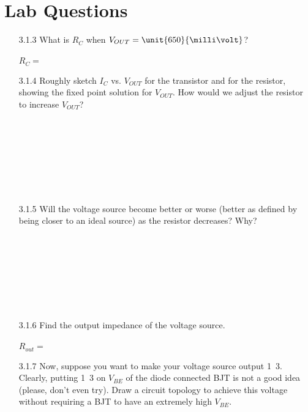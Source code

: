 \documentclass{article}
\begin{document}
\thispagestyle{plain}

\name

\section{Lab Questions}

\begin{enumerate}
	
	\item[3.1.3] What is $R_C$ when $V_{OUT}=\unit{650}{\milli\volt}$? \\ ~ \\
	$\boxed{R_{C}	= ~~~~~~~~~~~~~~~~~~~~~~~}$
	
	\item[3.1.4] Roughly sketch $I_{C}$ vs. $V_{OUT}$ for the transistor and for the resistor, showing the fixed point solution for $V_{OUT}$. How would we adjust the resistor to increase $V_{OUT}$?
	\\~\\~\\~\\~\\~\\~\\~\\
	
	\item[3.1.5] Will the voltage source become better or worse (better as defined by being closer to an ideal source) as the resistor decreases? Why?
	\\~\\~\\~\\~\\~\\~\\~\\
	
	\item[3.1.6] Find the output impedance of the voltage source.\\~\\
	$\boxed{R_{out}  	= ~~~~~~~~~~~~~~~~~~~~~~~}$
	
	\item[3.1.7] Now, suppose you want to make your voltage source output \unit{1.3}{\volt}. Clearly, putting \unit{1.3}{\volt} on $V_{BE}$ of the diode connected BJT is not a good idea (please, don't even try). Draw a circuit topology to achieve this voltage without requiring a BJT to have an extremely high $V_{BE}$.
	\\~\\~\\~\\~\\~\\~\\~\\


\end{enumerate}
\end{document}
